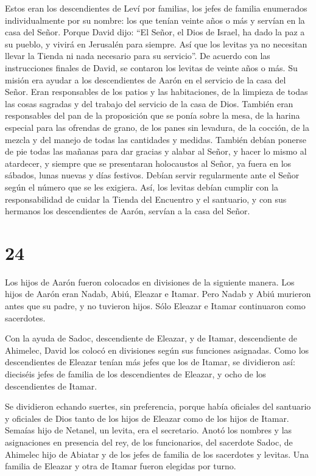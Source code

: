  Estos eran los descendientes de Leví por familias, los
jefes de familia enumerados individualmente por su nombre: los que
tenían veinte años o más y servían en la casa del Señor. 
Porque David dijo: ``El Señor, el Dios de Israel, ha dado la paz a su
pueblo, y vivirá en Jerusalén para siempre.  Así que los
levitas ya no necesitan llevar la Tienda ni nada necesario para su
servicio''.  De acuerdo con las instrucciones finales de
David, se contaron los levitas de veinte años o más.  Su
misión era ayudar a los descendientes de Aarón en el servicio de la casa
del Señor. Eran responsables de los patios y las habitaciones, de la
limpieza de todas las cosas sagradas y del trabajo del servicio de la
casa de Dios.  También eran responsables del pan de la
proposición que se ponía sobre la mesa, de la harina especial para las
ofrendas de grano, de los panes sin levadura, de la cocción, de la
mezcla y del manejo de todas las cantidades y medidas. 
También debían ponerse de pie todas las mañanas para dar gracias y
alabar al Señor, y hacer lo mismo al atardecer,  y siempre
que se presentaran holocaustos al Señor, ya fuera en los sábados, lunas
nuevas y días festivos. Debían servir regularmente ante el Señor según
el número que se les exigiera.  Así, los levitas debían
cumplir con la responsabilidad de cuidar la Tienda del Encuentro y el
santuario, y con sus hermanos los descendientes de Aarón, servían a la
casa del Señor.

\hypertarget{section-23}{%
\section{24}\label{section-23}}

 Los hijos de Aarón fueron colocados en divisiones de la
siguiente manera. Los hijos de Aarón eran Nadab, Abiú, Eleazar e Itamar.
 Pero Nadab y Abiú murieron antes que su padre, y no
tuvieron hijos. Sólo Eleazar e Itamar continuaron como sacerdotes.

 Con la ayuda de Sadoc, descendiente de Eleazar, y de
Itamar, descendiente de Ahimelec, David los colocó en divisiones según
sus funciones asignadas.  Como los descendientes de Eleazar
tenían más jefes que los de Itamar, se dividieron así: dieciséis jefes
de familia de los descendientes de Eleazar, y ocho de los descendientes
de Itamar.

 Se dividieron echando suertes, sin preferencia, porque
había oficiales del santuario y oficiales de Dios tanto de los hijos de
Eleazar como de los hijos de Itamar.  Semaías hijo de
Netanel, un levita, era el secretario. Anotó los nombres y las
asignaciones en presencia del rey, de los funcionarios, del sacerdote
Sadoc, de Ahimelec hijo de Abiatar y de los jefes de familia de los
sacerdotes y levitas. Una familia de Eleazar y otra de Itamar fueron
elegidas por turno.

